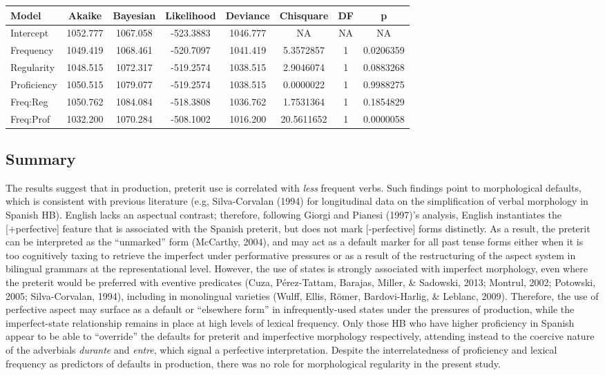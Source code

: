 \documentclass[
  english,
  man]{apa6}
\begin{document}
\begin{tabular}{l|c|c|c|c|c|c|c}
\hline
Model & Akaike & Bayesian & Likelihood & Deviance & Chisquare & DF & p\\
\hline
Intercept & 1052.777 & 1067.058 & -523.3883 & 1046.777 & NA & NA & NA\\
\hline
Frequency & 1049.419 & 1068.461 & -520.7097 & 1041.419 & 5.3572857 & 1 & 0.0206359\\
\hline
Regularity & 1048.515 & 1072.317 & -519.2574 & 1038.515 & 2.9046074 & 1 & 0.0883268\\
\hline
Proficiency & 1050.515 & 1079.077 & -519.2574 & 1038.515 & 0.0000022 & 1 & 0.9988275\\
\hline
Freq:Reg & 1050.762 & 1084.084 & -518.3808 & 1036.762 & 1.7531364 & 1 & 0.1854829\\
\hline
Freq:Prof & 1032.200 & 1070.284 & -508.1002 & 1016.200 & 20.5611652 & 1 & 0.0000058\\
\hline
\end{tabular}

\hypertarget{summary}{%
\subsection{Summary}\label{summary}}

The results suggest that in production, preterit use is correlated with \emph{less} frequent verbs. Such findings point to morphological defaults, which is consistent with previous literature (e.g, Silva-Corvalan (1994) for longitudinal data on the simplification of verbal morphology in Spanish HB). English lacks an aspectual contrast; therefore, following Giorgi and Pianesi (1997)'s analysis, English instantiates the {[}+perfective{]} feature that is associated with the Spanish preterit, but does not mark {[}-perfective{]} forms distinctly. As a result, the preterit can be interpreted as the ``unmarked'' form (McCarthy, 2004), and may act as a default marker for all past tense forms either when it is too cognitively taxing to retrieve the imperfect under performative pressures or as a result of the restructuring of the aspect system in bilingual grammars at the representational level. However, the use of states is strongly associated with imperfect morphology, even where the preterit would be preferred with eventive predicates (Cuza, Pérez-Tattam, Barajas, Miller, \& Sadowski, 2013; Montrul, 2002; Potowski, 2005; Silva-Corvalan, 1994), including in monolingual varieties (Wulff, Ellis, Römer, Bardovi-Harlig, \& Leblanc, 2009). Therefore, the use of perfective aspect may surface as a default or ``elsewhere form'' in infrequently-used states under the pressures of production, while the imperfect-state relationship remains in place at high levels of lexical frequency. Only those HB who have higher proficiency in Spanish appear to be able to ``override'' the defaults for preterit and imperfective morphology respectively, attending instead to the coercive nature of the adverbials \emph{durante} and \emph{entre}, which signal a perfective interpretation. Despite the interrelatedness of proficiency and lexical frequency as predictors of defaults in production, there was no role for morphological regularity in the present study.
\end{document}

